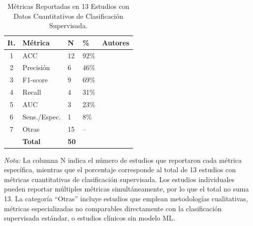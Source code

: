 \documentclass[ASNA,twocolumn]{USG}
\begin{document}
	\begin{table}[!t]
		\centering
		\caption{Métricas Reportadas en 13 Estudios con Datos Cuantitativos de
			Clasificación Supervisada.\label{tab8}}
		{\setlength{\tabcolsep}{4pt}
			\begin{tabular*}{\textwidth}{@{\extracolsep\fill}cllll@{\extracolsep\fill}}
				\toprule
				\textbf{It.} & \textbf{Métrica} & \textbf{N} & \textbf{\%} & \textbf{Autores} \\
				\midrule
				1 & ACC          & 12 & 92\% & \cite{Johnson2025,Shaik2025,Radocaj2025,Washington2022,Sholikah2024,Sariyanidi2025,Hassan2025,Hwang2024,Aljbori2025,Rhatassi2025,Ramachandran2025,Hosney2024} \\
				2 & Precisión    & 6  & 46\% & \cite{Shaik2025,Cicceri2026,Hwang2024,Aljbori2025,Ramachandran2025,Hosney2024} \\
				3 & F1-score     & 9  & 69\% & \cite{Shaik2025,Radocaj2025,Washington2022,Sholikah2024,Hassan2025,Hwang2024,Aljbori2025,Ramachandran2025,Hosney2024} \\
				4 & Recall       & 4  & 31\% & \cite{Shaik2025,Aljbori2025,Ramachandran2025,Hosney2024} \\
				5 & AUC          & 3  & 23\% & \cite{Shaik2025,Aljbori2025,Ramachandran2025} \\
				6 & Sens./Espec. & 1  & 8\%  & \cite{Leo2018} \\
				7 & Otras        & 15 & --   & \cite{He2019,Reed2021,Lecciso2021,Ahmad2024,Rhatassi2024,Levy2024,Alsubai2025,Rudovic2018,Rudovic2019,Almeida2019,Alam2025,Nagae2022,Papaioannou2021,Dapogny2019,AkinBulbul2024} \\
				& \textbf{Total} & \textbf{50} & & \\
				\bottomrule
		\end{tabular*}}
		\begin{tablenotes}
			\item {\it Nota:} La columna N indica el número de estudios que reportaron cada
			métrica específica, mientras que el porcentaje corresponde al total de 13 estudios
			con métricas cuantitativas de clasificación supervisada. Los estudios individuales
			pueden reportar múltiples métricas simultáneamente, por lo que el total no suma 13.
			La categoría ``Otras'' incluye estudios que emplean metodologías cualitativas,
			métricas especializadas no comparables directamente con la clasificación supervisada
			estándar, o estudios clínicos sin modelo ML.
		\end{tablenotes}
	\end{table}
	
\end{document}

